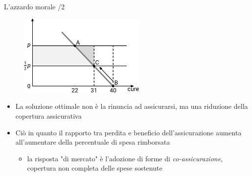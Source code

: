 \documentclass[aspectratio=64,11pt]{beamer}
\begin{document}
\begin{frame}{L'azzardo morale /2}
\begin{figure}[htbp]
\centering
\includegraphics[height=4cm]{./figure/moral-hazard-3.pdf}
\end{figure}

\begin{itemize}
\item La soluzione ottimale non è la rinuncia ad assicurarsi, ma una riduzione
della copertura assicurativa
\item Ciò in quanto il rapporto tra perdita e beneficio dell'assicurazione aumenta
all'aumentare della percentuale di spesa rimborsata
\begin{itemize}
\item la risposta "di mercato" è l'adozione di forme di \emph{co-assicurazione},
copertura non completa delle spese sostenute
\end{itemize}
\end{itemize}
\end{frame}
\end{document}

